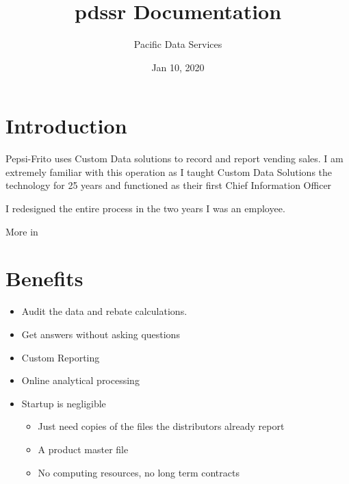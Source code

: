 \documentclass[letterpaper,10pt,english]{sphinxmanual}
\title{pdssr Documentation}
\date{Jan 10, 2020}
\author{Pacific Data Services}
\begin{document}
\pagestyle{empty}
\sphinxmaketitle
\pagestyle{plain}
\sphinxtableofcontents
\pagestyle{normal}
\label{\detokenize{index::doc}}



\chapter{Introduction}
\label{\detokenize{index:introduction}}
Pepsi-Frito uses Custom Data solutions to record and report vending sales.  I am extremely
familiar with this operation as I taught Custom Data Solutions the technology for 25 years
and functioned as their first Chief Information Officer

I redesigned the entire process in the two years I was an employee.

More in {\hyperref[\detokenize{Contributions::doc}]{}}


\chapter{Benefits}
\label{\detokenize{index:benefits}}\begin{itemize}
\item {} 
Audit the data and rebate calculations. {\hyperref[\detokenize{Audit::doc}]{}}

\item {} 
Get answers without asking questions {\hyperref[\detokenize{Answers::doc}]{}}

\item {} 
Custom Reporting

\item {} 
Online analytical processing

\item {} 
Startup is negligible
\begin{itemize}
\item {} 
Just need copies of the files the distributors already report {\hyperref[\detokenize{cds_record_layout::doc}]{}}

\item {} 
A product master file

\item {} 
No computing resources, no long term contracts

\end{itemize}

\end{itemize}
\end{document}
